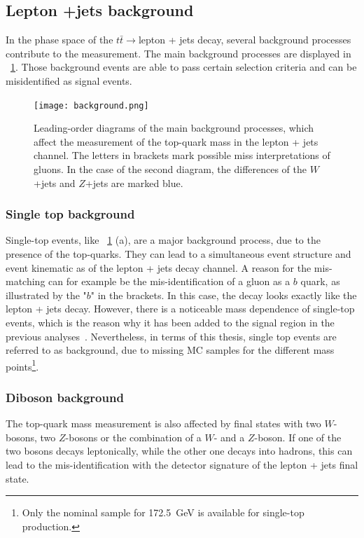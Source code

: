   
 \subsection{Lepton +jets background}
 
 
 In the phase space of the $t\bar{t} \rightarrow$lepton + jets decay, several background processes contribute to the measurement. The main background processes are displayed in ~\cref{fig:43}.  Those background events are able to pass certain selection criteria and can be misidentified as signal events. 
 

 
 \begin{figure}[h]
 	\centering
 	\texttt{[image: background.png]}
 	\caption{Leading-order diagrams of the main background processes, which affect the measurement of the top-quark mass in the lepton + jets channel.  The letters in brackets mark possible miss interpretations of gluons. In the case of the  second diagram, the differences of the $W$+jets and $Z$+jets are marked blue. } 
 	\label{fig:43}
 \end{figure}
 
 
 \subsubsection{Single top background}
 
 Single-top events, like ~\cref{fig:43} (a), are a major background process, due to the presence of the top-quarks. They can lead to a simultaneous event structure and  event kinematic as of the lepton + jets  decay channel. A reason for the mis-matching can for example be the mis-identification of a gluon as a $b$ quark, as illustrated by the "$b$" in the brackets. In this case, the decay looks exactly like the lepton + jets decay. 
 However, there is a noticeable mass dependence of single-top events, which is the reason why it has been added to the signal region in the previous analyses~\cite{ATLAS-CONF-2017-071, Aad:2015nba}. Nevertheless, in terms of this thesis, single top events are referred to as background, due to missing MC samples for the different mass points\footnote{Only the nominal sample for 172.5~GeV is available for single-top production.}. 
 
 \subsubsection{Diboson background}
 The top-quark mass measurement is also affected by final states with two $W$-bosons, two $Z$-bosons or the combination of a $W$- and a $Z$-boson.  If one of the two bosons decays leptonically, while the other one decays into hadrons, this can lead to the mis-identification with the detector signature of the lepton + jets final state.  
 

